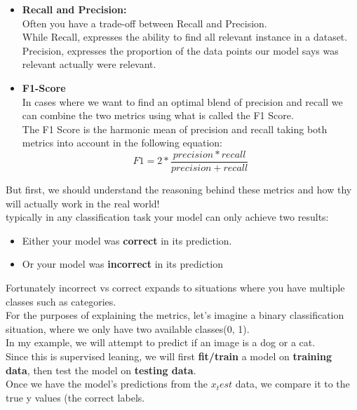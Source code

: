 \documentclass[12pt]{article}
\begin{document}
\begin{itemize}
	\item 
	\textbf{Recall and Precision:}\\
	Often you have a trade-off between Recall and Precision.\\
	While Recall, expresses the ability to find all relevant instance in a dataset.\\
	Precision, expresses the proportion of the data points our model says was relevant actually were relevant.
	\item
	\textbf{F1-Score}\\
	In cases where we want to find an optimal blend of precision and recall we can combine the two metrics using what is called the F1 Score.\\
	The F1 Score is the harmonic mean of precision and recall taking both metrics into account in the following equation:\\
	\begin{equation}
		F1 = 2 * \frac{precision * recall}{precision + recall}
	\end{equation}
\end{itemize}
But first, we should understand the reasoning behind these metrics and how thy will actually work in the real world!\\

typically in any classification task your model can only achieve two results:
\begin{itemize}
	\item
	Either your model was \textbf{correct} in its prediction.
	\item
	Or your model was \textbf{incorrect} in its prediction 
\end{itemize}


Fortunately incorrect vs correct expands to situations where you have multiple classes such as categories.\\
For the purposes of explaining the metrics, let's imagine a binary classification situation, where we only have two available classes(0, 1).\\


In my example, we will attempt to predict if an image is a dog or a cat.\\
Since this is supervised leaning, we will first \textbf{fit/train} a model on \textbf{training data}, then test the model on\textbf{ testing data}.\\
Once we have the model's predictions from the $x_test$ data, we compare it to the true y values (the correct labels.\\
\newpage
\end{document}
